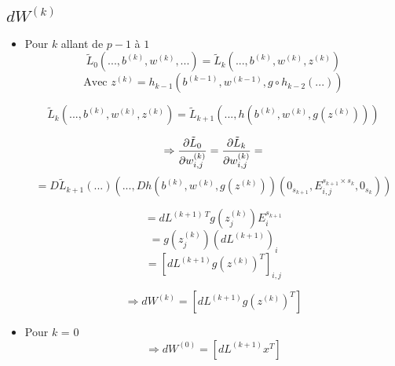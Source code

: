 \subsection{$dW^{(k)}$}
	\begin{itemize}
		\item Pour $k$ allant de $p-1$ à $1$\\
		\[\tilde{L}_0\left(...,b^{(k)}, w^{(k)}, ...\right) = \tilde{L}_{k}\left(...,b^{(k)}, w^{(k)}, z^{(k)}\right)\]
		\[\text{Avec } z^{(k)} = h_{k-1}\left(b^{(k-1)}, w^{(k-1)}, g\circ h_{k-2}\left(...\right)\right)\]
		\[\]
		
		\[\tilde{L}_{k}(..., b^{(k)}, w^{(k)}, z^{(k)}) = \tilde{L}_{k+1}\left(..., h\left(b^{(k)}, w^{(k)}, g\left(z^{(k)}\right)\right)\right)\]
			
		\[\Rightarrow \pdv{\tilde{L}_0}{w_{i,j}^{(k)}}(...) = \pdv{\tilde{L}_k}{w_{i,j}^{(k)}}(...) =\] 
		\[= D\tilde{L}_{k+1}\left(
															...%
												\right)\left(
																		 ..., Dh\left(
																									b^{(k)}, w^{(k)}, g\left(z^{(k)}\right)
																						\right)
																						\left(
																									0_{s_{k+1}}, E_{i, j}^{s_{k+1}\times s_k}, 0_{s_k}
																						\right)
															 \right)\]
																									
		\[= dL^{(k+1)~T} g\left(z^{(k)}_j\right)E_i^{s_{k + 1}}\]
		\[= g\left(z^{(k)}_j\right) \left(dL^{(k+1)}\right)_i\]
		\[= \left[dL^{(k+1)} g\left(z^{(k)}\right)^T\right]_{i,j}\]
		
		\[\Rightarrow \boxed{dW^{(k)} = \left[dL^{(k+1)}g\left(z^{(k)}\right)^T\right]}\]
		
		\item Pour $k$ = 0\\
			\[\Rightarrow \boxed{dW^{(0)} = \left[dL^{(k+1)}x^T\right]}\]
	\end{itemize}